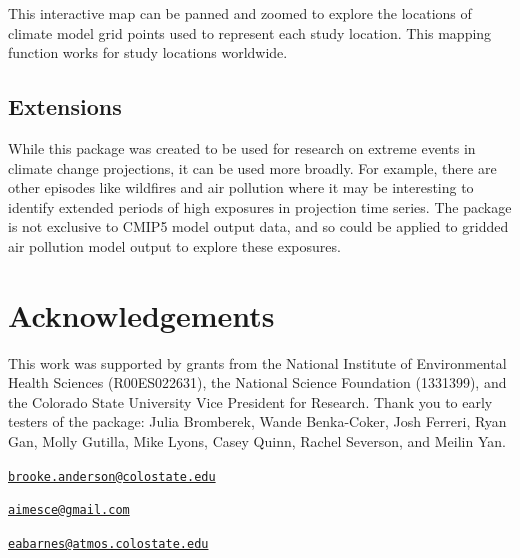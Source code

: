 \noindent This interactive map can be panned and zoomed to explore the
locations of climate model grid points used to represent each study
location. This mapping function works for study locations worldwide.

\subsection{Extensions}\label{extensions}

While this package was created to be used for research on extreme events
in climate change projections, it can be used more broadly. For example,
there are other episodes like wildfires and air pollution where it may
be interesting to identify extended periods of high exposures in
projection time series. The  package is not
exclusive to CMIP5 model output data, and so could be applied to gridded
air pollution model output to explore these exposures.

\section{Acknowledgements}\label{acknowledgements}

This work was supported by grants from the National Institute of
Environmental Health Sciences (R00ES022631), the National Science
Foundation (1331399), and the Colorado State University Vice President
for Research. Thank you to early testers of the package: Julia
Bromberek, Wande Benka-Coker, Josh Ferreri, Ryan Gan, Molly Gutilla,
Mike Lyons, Casey Quinn, Rachel Severson, and Meilin Yan.



\address{%
G. Brooke Anderson\\
Colorado State University\\
Department of Environmental \& Radiological Health Sciences\\ 1681 Campus Delivery\\ Fort Collins, Colorado 80523\\
}
\href{mailto:brooke.anderson@colostate.edu}{\nolinkurl{brooke.anderson@colostate.edu}}

\address{%
Colin Eason\\
Colorado State University\\
Department of Computer Science\\ 1873 Campus Delivery\\ Fort Collins, Colorado 80523\\
}
\href{mailto:aimesce@gmail.com}{\nolinkurl{aimesce@gmail.com}}

\address{%
Elizabeth A. Barnes\\
Colorado State University\\
Department of Atmospheric Science\\ 1371 Campus Delivery\\ Fort Collins, CO 80523\\
}
\href{mailto:eabarnes@atmos.colostate.edu}{\nolinkurl{eabarnes@atmos.colostate.edu}}

